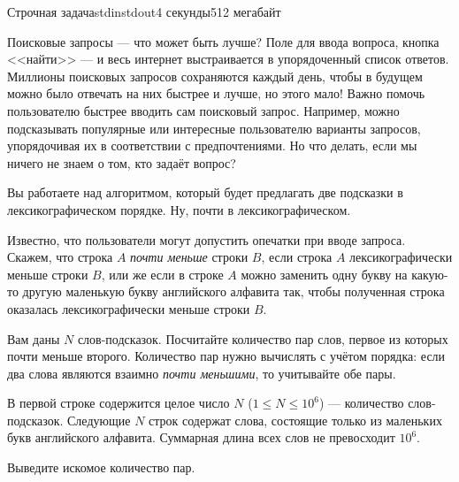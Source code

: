 \begin{problem}{Строчная задача}{stdin}{stdout}{4 секунды}{512 мегабайт}

Поисковые запросы --- что может быть лучше? Поле для ввода вопроса, кнопка <<найти>> --- и весь интернет выстраивается в упорядоченный список ответов. Миллионы поисковых запросов сохраняются каждый день, чтобы в будущем можно было отвечать на них быстрее и лучше, но этого мало! Важно помочь пользователю быстрее вводить сам поисковый запрос. Например, можно подсказывать популярные или интересные пользователю варианты запросов, упорядочивая их в соответствии с предпочтениями. Но что делать, если мы ничего не знаем о том, кто задаёт вопрос? 

Вы работаете над алгоритмом, который будет предлагать две подсказки в лексикографическом порядке. Ну, почти в лексикографическом.

Известно, что пользователи могут допустить опечатки при вводе запроса. Скажем, что строка $A$ \emph{почти меньше} строки $B$, если строка $A$ лексикографически меньше строки $B$, или же если в строке $A$ можно заменить одну букву на какую-то другую маленькую букву английского алфавита так, чтобы полученная строка оказалась лексикографически меньше строки $B$. 

Вам даны $N$ слов-подсказок. Посчитайте количество пар слов, первое из которых почти меньше второго. Количество пар нужно вычислять с учётом порядка: если два слова являются взаимно \emph{почти меньшими}, то учитывайте обе пары.


\InputFile
В первой строке содержится целое число $N$ ($1 \le N \le 10^6$) --- количество слов-подсказок. 
Следующие $N$ строк содержат слова, состоящие только из маленьких букв английского алфавита. Суммарная длина всех слов не превосходит $10^6$.

\OutputFile
Выведите искомое количество пар.

\Examples

\begin{example}
%
%
%
\end{example}

\end{problem}

